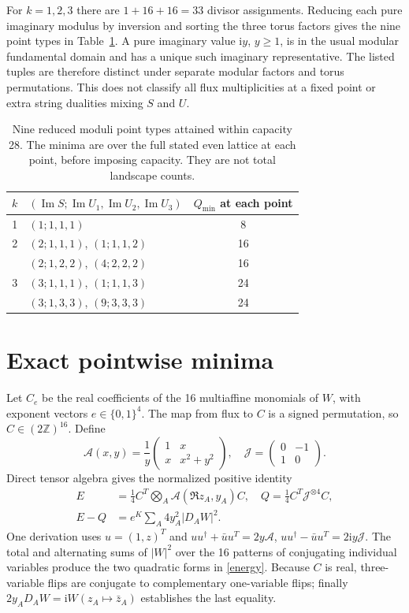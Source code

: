 \documentclass[11pt]{article}
\newcommand{\ii}{\mathrm{i}}
\newcommand{\Z}{\mathbb Z}
\newcommand{\Imn}{\operatorname{Im}}
\begin{document}
For $k=1,2,3$ there are $1+16+16=33$ divisor assignments. Reducing each
pure imaginary modulus by inversion and sorting the three torus factors
gives the nine point types in Table~\ref{points}. A pure imaginary value
$\ii y$, $y\ge1$, is in the usual modular fundamental domain and has a
unique such imaginary representative. The listed tuples are therefore
distinct under separate modular factors and torus permutations. This does
not classify all flux multiplicities at a fixed point or extra string
dualities mixing $S$ and $U$.

\begin{table}[t]
\centering
\begin{tabular}{c l c}
\toprule
$k$ & $(\Imn S;\Imn U_1,\Imn U_2,\Imn U_3)$ & $Q_{\min}$ at each point\\
\midrule
1 & $(1;1,1,1)$ & 8\\
2 & $(2;1,1,1)$, $(1;1,1,2)$ & 16\\
  & $(2;1,2,2)$, $(4;2,2,2)$ & 16\\
3 & $(3;1,1,1)$, $(1;1,1,3)$ & 24\\
  & $(3;1,3,3)$, $(9;3,3,3)$ & 24\\
\bottomrule
\end{tabular}
\caption{Nine reduced moduli point types attained within capacity 28.
The minima are over the full stated even lattice at each point, before
imposing capacity. They are not total landscape counts.}
\label{points}
\end{table}

\section{Exact pointwise minima}
Let $C_e$ be the real coefficients of the 16 multiaffine monomials of $W$,
with exponent vectors $e\in\{0,1\}^4$. The map from flux to $C$ is a signed
permutation, so $C\in(2\Z)^{16}$. Define
\begin{equation}
\mathcal A(x,y)=\frac1y\begin{pmatrix}1&x\\x&x^2+y^2\end{pmatrix},\quad
\mathcal J=\begin{pmatrix}0&-1\\1&0\end{pmatrix}.
\end{equation}
Direct tensor algebra gives the normalized positive identity
\begin{align}
E&=\tfrac14 C^T\bigotimes_A\mathcal A(\Re z_A,y_A)C,
\quad Q=\tfrac14C^T\mathcal J^{\otimes4}C,\\
E-Q&=e^K\sum_A4y_A^2|D_AW|^2.
\label{energy}
\end{align}
One derivation uses $u=(1,z)^T$ and
$uu^\dagger+\bar u u^T=2y\mathcal A$,
$uu^\dagger-\bar u u^T=2\ii y\mathcal J$. The total and alternating sums
of $|W|^2$ over the 16 patterns of conjugating individual variables produce
the two quadratic forms in \eqref{energy}. Because $C$ is real,
three-variable flips are conjugate to complementary one-variable flips;
finally $2y_AD_AW=\ii W(z_A\mapsto\bar z_A)$ establishes the last equality.
\end{document}
